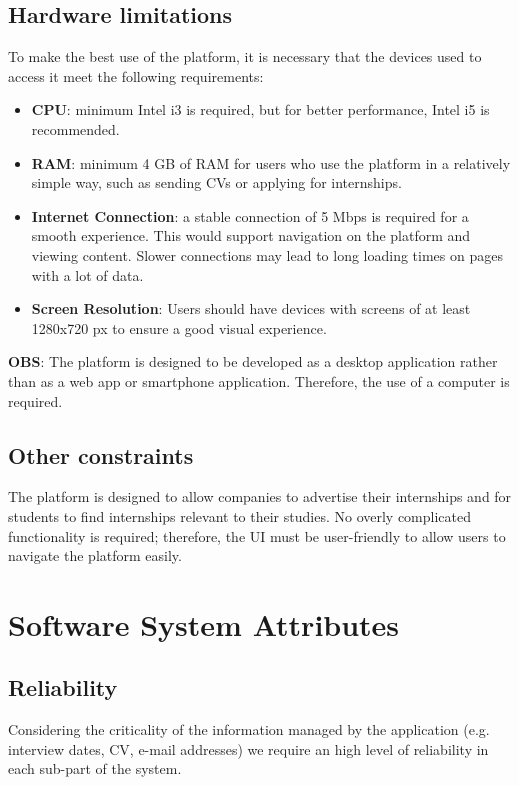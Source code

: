 		\subsection{Hardware limitations}
		
			To make the best use of the platform, it is necessary that the devices used to access it meet the following requirements:
			
			\begin{itemize}
				\item \textbf{CPU}: minimum Intel i3 is required, but for better performance, Intel i5 is recommended.
				\item \textbf{RAM}: minimum 4 GB of RAM for users who use the platform in a relatively simple way, such as sending CVs or applying for internships.
				\item\textbf{Internet Connection}: a stable connection of 5 Mbps is required for a smooth experience. This would support navigation on the platform and viewing content. Slower connections may lead to long loading times on pages with a lot of data.
				\item \textbf{Screen Resolution}: Users should have devices with screens of at least 1280x720 px to ensure a good visual experience.
			\end{itemize}
			
			
			\textbf{OBS}: The platform is designed to be developed as a desktop application rather than as a web app or smartphone application. Therefore, the use of a computer is required.
			
			
		\subsection{Other constraints}
			The platform is designed to allow companies to advertise their internships and for students to find internships relevant to their studies. No overly complicated functionality is required; therefore, the UI must be user-friendly to allow users to navigate the platform easily.
	\section{Software System Attributes}
		\subsection{Reliability}
			Considering the criticality of the information managed by the application (e.g. interview dates, CV, e-mail addresses) we require an high level of reliability in each sub-part of the system.
			
